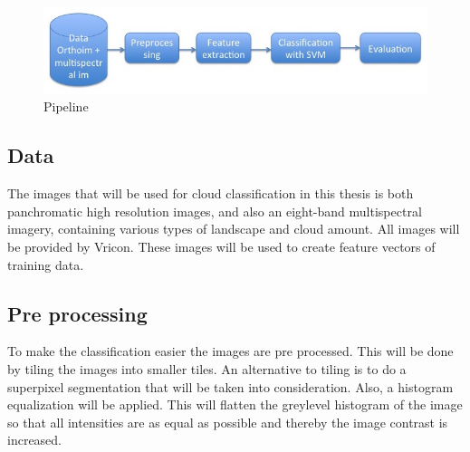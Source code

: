 \documentclass{article}
\begin{document}
\begin{figure}[h!]
    \centering
    \includegraphics[scale=0.5]{fig/pipeline}
    \caption{Pipeline}
    \label{fig:pipeline}
\end{figure}

\subsection{Data}
The images that will be used for cloud classification in this thesis is both panchromatic high resolution images, and also an eight-band multispectral imagery, containing various types of landscape and cloud amount. All images will be provided by Vricon. These images will be used to create feature vectors of training data.

\subsection{Pre processing}
To make the classification easier the images are pre processed. This will be done by tiling the images into smaller tiles. An alternative to tiling is to do a superpixel segmentation that will be taken into consideration. Also, a histogram equalization will be applied. This will flatten the greylevel histogram of the image so that all intensities are as equal as possible and thereby the image contrast is increased.



\end{document}
